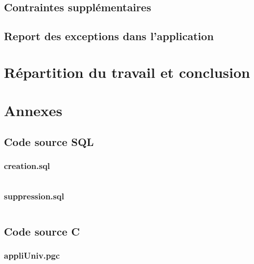 \documentclass[12pt,titlepage,a4paper]{report}
\begin{document}
		\section{Contraintes supplémentaires}
		

		\section{Report des exceptions dans l'application}
		

	\chapter{Répartition du travail et conclusion}
		

	\chapter{Annexes}
		\section{Code source SQL}
			\subsection{creation.sql}
			\inputminted[tabsize=4,linenos,fontsize=\small]{sql}{../src/SQL/creation.sql}

			\subsection{suppression.sql}		
			\inputminted[tabsize=4,linenos,fontsize=\small]{sql}{../src/SQL/suppression.sql}

		\section{Code source C}
			\subsection{appliUniv.pgc}
			\inputminted[tabsize=4,linenos,fontsize=\small]{sql}{../src/C/appliUniv.pgc}
\end{document}
